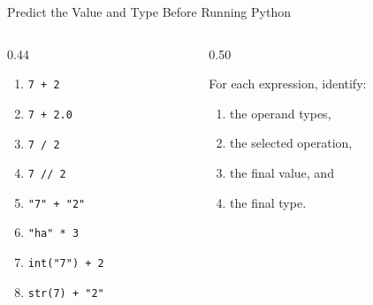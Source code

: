 \documentclass[aspectratio=169,10pt]{beamer}
\begin{document}
\begin{frame}{Predict the Value and Type Before Running Python}

  \begin{columns}[T,onlytextwidth]

    \begin{column}{0.44\textwidth}

      \begin{enumerate}

        \item \texttt{7 + 2}

        \item \texttt{7 + 2.0}

        \item \texttt{7 / 2}

        \item \texttt{7 // 2}

        \item \texttt{"7" + "2"}

        \item \texttt{"ha" * 3}

        \item \texttt{int("7") + 2}

        \item \texttt{str(7) + "2"}

      \end{enumerate}

    \end{column}

    \begin{column}{0.50\textwidth}

      \begin{activity}

        For each expression, identify:

        \begin{enumerate}

          \item the operand types,

          \item the selected operation,

          \item the final value, and

          \item the final type.

        \end{enumerate}

      \end{activity}

    \end{column}

  \end{columns}

\end{frame}
\end{document}
